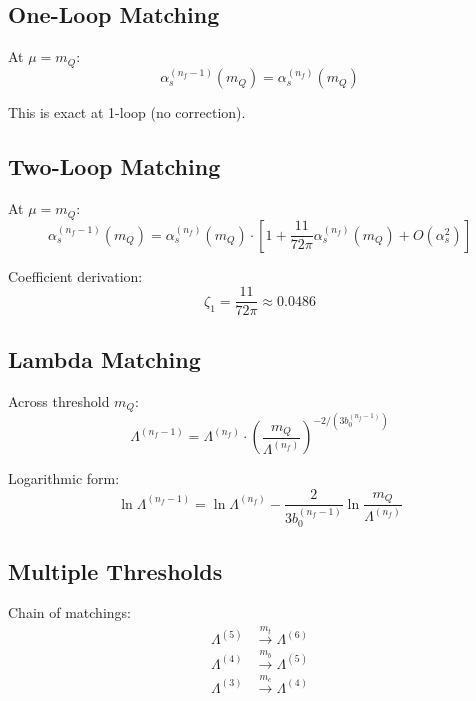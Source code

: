 \documentclass[11pt,a4paper]{article}
\theoremstyle{definition}
\begin{document}
\subsection{One-Loop Matching}
\label{subsec:1loop-match}

At $\mu = m_Q$:
\begin{equation}
\label{eq:app-1loop-match}
\alpha_s^{(n_f-1)}(m_Q) = \alpha_s^{(n_f)}(m_Q)
\end{equation}

This is exact at 1-loop (no correction).

\subsection{Two-Loop Matching}
\label{subsec:2loop-match}

At $\mu = m_Q$:
\begin{equation}
\label{eq:app-2loop-match}
\alpha_s^{(n_f-1)}(m_Q) = \alpha_s^{(n_f)}(m_Q)
  \cdot \left[1 + \frac{11}{72\pi}\alpha_s^{(n_f)}(m_Q) + O(\alpha_s^2)\right]
\end{equation}

Coefficient derivation:
\begin{equation}
\label{eq:app-2loop-coeff}
\zeta_1 = \frac{11}{72\pi} \approx 0.0486
\end{equation}

\subsection{Lambda Matching}
\label{subsec:lambda-match-app}

Across threshold $m_Q$:
\begin{equation}
\label{eq:app-lambda-match}
\Lambda^{(n_f-1)} = \Lambda^{(n_f)} \cdot
  \left(\frac{m_Q}{\Lambda^{(n_f)}}\right)^{-2/(3b_0^{(n_f-1)})}
\end{equation}

Logarithmic form:
\begin{equation}
\label{eq:app-lambda-match-log}
\ln\Lambda^{(n_f-1)} = \ln\Lambda^{(n_f)}
  - \frac{2}{3b_0^{(n_f-1)}}\ln\frac{m_Q}{\Lambda^{(n_f)}}
\end{equation}

\subsection{Multiple Thresholds}
\label{subsec:multi-thresh}

Chain of matchings:
\begin{align}
\label{eq:app-chain-1}
\Lambda^{(5)} &\xrightarrow{m_t} \Lambda^{(6)} \\
\label{eq:app-chain-2}
\Lambda^{(4)} &\xrightarrow{m_b} \Lambda^{(5)} \\
\label{eq:app-chain-3}
\Lambda^{(3)} &\xrightarrow{m_c} \Lambda^{(4)}
\end{align}
\end{document}
